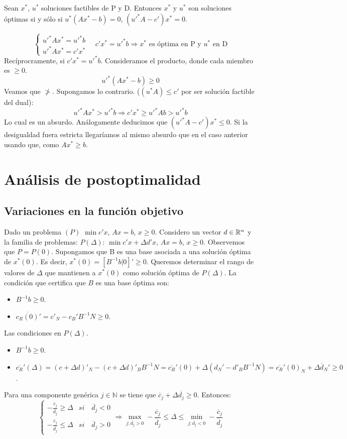 \documentclass[PM.tex]{subfiles}
\begin{document}
\begin{theorem} Sean $x^*$, $u^*$ soluciones factibles de P y D. Entonces $x^*$ y $u^*$ son soluciones óptimas si y sólo si $u^*(Ax^*-b)=0$, $(u'^{*} A-c')x^*=0$.
\end{theorem}
\begin{dem}
\[
\begin{cases}
u'^* A x^* = u'^*b \\
u'^*A x^* = c'x^* 
\end{cases}
\quad c'x^* = u'^*b \Rightarrow \text{$x^*$ es óptima en P y $u^*$ en D}
\]
Recíprocramente, si $c'x^*=u'^*b$. Consideramos el producto, donde cada miembro es $\geq 0$.
\[
u'^*(Ax^*-b)\geq 0
\]
Veamos que $\not >$. Supongamos lo contrario. ($(u^*A) \leq c'$ por ser solución factible del dual):
\[
u'^*Ax^* > u'^* b \Rightarrow c'x^* \geq u'^*Ab>u'^*b
\]
Lo cual es un absurdo. Análogamente deducimos que $(u'^*A-c')x^* \leq 0$. Si la desigualdad fuera estricta llegaríamos al mismo absurdo que en el caso anterior usando que, como $Ax^* \geq b$.
\end{dem}
\section{Análisis de postoptimalidad}
\subsection{Variaciones en la función objetivo}
Dado un problema $(P)$ $\min c'x$, $Ax=b$, $x\geq 0$. Considero un vector $d\in\mathbb{R}^n$ y la familia de problemas: $P(\Delta)$: $\min c'x + \Delta d'x$, $Ax=b$, $x\geq 0$. Observemos que $P=P(0)$. Supongamos que B es una base asociada a una solución óptima de $x^*(0)$. Es decir, $x^*(0)=[B^{-1}b | 0]' \geq 0$. Queremos determinar el rango de valores de $\Delta$ que mantienen a $x^*(0)$ como solución óptima de $P(\Delta)$. La condición que certifica que $B$ es una base óptima son:
\begin{itemize}
\item $B^{-1}b \geq 0$.
\item $\overline{c_R(0)}'  = c'_N - c_B'B^{-1}N \geq 0$. 
\end{itemize}
Las condiciones en $P(\Delta)$. 
\begin{itemize}
\item $B^{-1}b \geq 0$.
\item $\overline{c_R}'(\Delta) = (c +\Delta d)'_N- (c+\Delta d)'_B B^{-1}N = \overline{c_R}'(0)  + \Delta (d_N'-d'_BB^{-1}N) =  \overline{c_R}'(0)_N + \Delta \overline{d}_N'\geq 0$. 
\end{itemize}
Para una componente genérica $j\in \mathbb{N}$ se tiene que $\overline{c}_j+\Delta \overline{d_j}\geq 0$. Entonces:
\[
\begin{cases}
-\frac{\overline{c}_j}{\overline{d}_j} \geq \Delta & si \quad \overline{d}_j <0\\
-\frac{\overline{c}_j}{\overline{d}_j} \leq \Delta & si \quad \overline{d}_j >0
\end{cases}
\Rightarrow \max_{j:\overline{d}_j >0}-\frac{\overline{c}_j}{\overline{d}_j} \leq \Delta \leq \min_{j:\overline{d}_j <0}-\frac{\overline{c}_j}{\overline{d}_j}
\]
\end{document}
